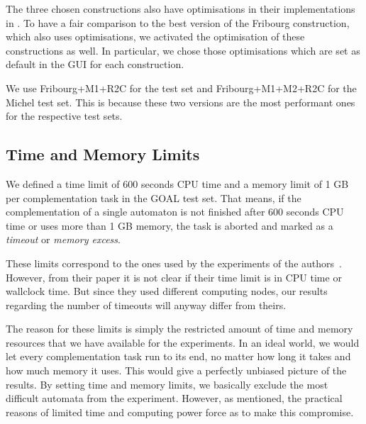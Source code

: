 The three chosen constructions also have optimisations in their implementations in \goal{}. To have a fair comparison to the best version of the Fribourg construction, which also uses optimisations, we activated the optimisation of these constructions as well. In particular, we chose those optimisations which are set as default in the \goal{} GUI for each construction.

We use Fribourg+M1+R2C for the \goal{} test set and Fribourg+M1+M2+R2C for the Michel test set. This is because these two versions are the most performant ones for the respective test sets.




\subsection{Time and Memory Limits}
We defined a time limit of 600 seconds CPU time and a memory limit of 1 GB per complementation task in the GOAL test set. That means, if the complementation of a single automaton is not finished after 600 seconds CPU time or uses more than 1 GB memory, the task is aborted and marked as a \textit{timeout} or \textit{memory excess}.

These limits correspond to the ones used by the experiments of the \goal{} authors~\cite{2011_tsai}. However, from their paper it is not clear if their time limit is in CPU time or wallclock time. But since they used different computing nodes, our results regarding the number of timeouts will anyway differ from theirs.

The reason for these limits is simply the restricted amount of time and memory resources that we have available for the experiments. In an ideal world, we would let every complementation task run to its end, no matter how long it takes and how much memory it uses. This would give a perfectly unbiased picture of the results. By setting time and memory limits, we basically exclude the most difficult automata from the experiment. However, as mentioned, the practical reasons of limited time and computing power force as to make this compromise.

